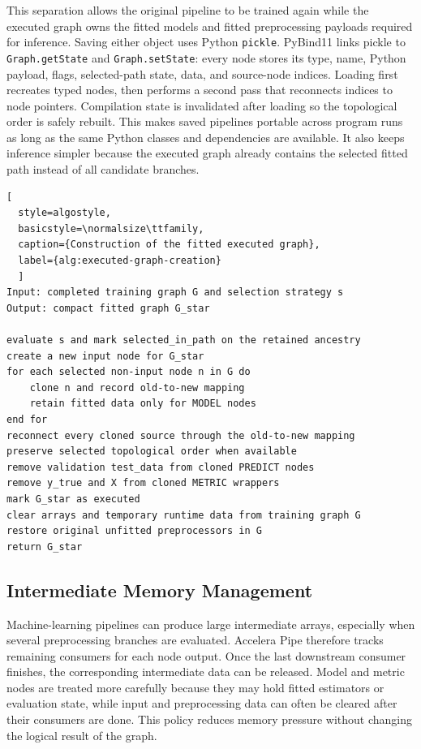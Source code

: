This separation allows the original pipeline to be trained again while the
executed graph owns the fitted models and fitted preprocessing payloads required
for inference. Saving either object uses Python \texttt{pickle}. PyBind11 links
pickle to \texttt{Graph.getState} and \texttt{Graph.setState}: every node stores
its type, name, Python payload, flags, selected-path state, data, and source-node
indices. Loading first recreates typed nodes, then performs a second pass that
reconnects indices to node pointers. Compilation state is invalidated after
loading so the topological order is safely rebuilt. This makes saved pipelines
portable across program runs as long as the same Python classes and dependencies
are available. It also keeps inference simpler because the executed graph already
contains the selected fitted path instead of all candidate branches.


\newpage
\begin{lstlisting}[
  style=algostyle,
  basicstyle=\normalsize\ttfamily,
  caption={Construction of the fitted executed graph},
  label={alg:executed-graph-creation}
  ]
Input: completed training graph G and selection strategy s
Output: compact fitted graph G_star

evaluate s and mark selected_in_path on the retained ancestry
create a new input node for G_star
for each selected non-input node n in G do
    clone n and record old-to-new mapping
    retain fitted data only for MODEL nodes
end for
reconnect every cloned source through the old-to-new mapping
preserve selected topological order when available
remove validation test_data from cloned PREDICT nodes
remove y_true and X from cloned METRIC wrappers
mark G_star as executed
clear arrays and temporary runtime data from training graph G
restore original unfitted preprocessors in G
return G_star
\end{lstlisting}



\subsection{Intermediate Memory Management}

Machine-learning pipelines can produce large intermediate arrays, especially when
several preprocessing branches are evaluated. Accelera Pipe therefore tracks
remaining consumers for each node output. Once the last downstream consumer finishes,
the corresponding intermediate data can be released. Model and metric nodes are
treated more carefully because they may hold fitted estimators or evaluation state,
while input and preprocessing data can often be cleared after their consumers are
done. This policy reduces memory pressure without changing the logical result of the
graph.


